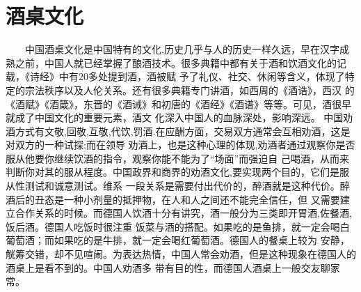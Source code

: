 \section{酒桌文化}
　　中国酒桌文化是中国特有的文化,历史几乎与人的历史一样久远，早在汉字成熟之前，中国人就已经掌握了酿酒技术。很多典籍中都有关于酒和饮酒文化的记载，《诗经》中有20多处提到酒，酒被赋
予了礼仪、社交、休闲等含义，体现了特定的宗法秩序以及人伦关系。还有很多典籍专门讲酒，如西周的《酒诰》，西汉
的《酒赋》《酒箴》，东晋的《酒诫》和初唐的《酒经》《酒谱》等等。可见，酒很早就成了中国文化的重要元素，酒文
化深入中国人的血脉深处，影响深远。
中国劝酒方式有文敬,回敬,互敬,代饮,罚酒.在应酬方面，交易双方通常会互相劝酒，这是对双方的一种试探;而在领导
劝酒上，也是这种心理的体现,劝酒者通过观察你是否服从他要你继续饮酒的指令，观察你能不能为了“场面”而强迫自
己喝酒，从而来判断你对其的服从程度。中国政界和商界的劝酒文化,要实现两个目的，它们是服从性测试和诚意测试。维系
一段关系是需要付出代价的，醉酒就是这种代价。醉酒后的丑态是一种小剂量的抵押物，在人和人之间还不能完全信任，但
又需要建立合作关系的时候。而德国人饮酒十分有讲究，酒一般分为三类即开胃酒,佐餐酒,饭后酒。德国人吃饭时很注重
饭菜与酒的搭配。如果吃的是鱼排，就一定会喝白葡萄酒；而如果吃的是牛排，就一定会喝红葡萄酒。德国人的餐桌上较为
安静，觥筹交错，却不见喧闹。为表达热情，中国人常会劝酒，但是这种现象在德国人的酒桌上是看不到的。中国人劝酒多
带有目的性，而德国人酒桌上一般交友聊家常。